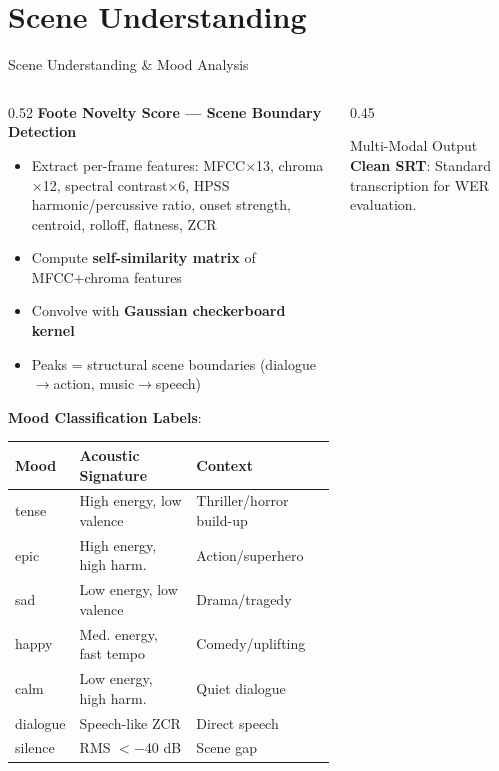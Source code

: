 \documentclass[aspectratio=169]{beamer}
\begin{document}
\section{Scene Understanding}
\begin{frame}{Scene Understanding \& Mood Analysis}
  \begin{columns}[T]
    \begin{column}{0.52\textwidth}
      \textbf{Foote Novelty Score — Scene Boundary Detection}
      \begin{itemize}
        \item Extract per-frame features: MFCC$\times$13, chroma$\times$12, spectral contrast$\times$6, HPSS harmonic/percussive ratio, onset strength, centroid, rolloff, flatness, ZCR
        \item Compute \textbf{self-similarity matrix} of MFCC+chroma features
        \item Convolve with \textbf{Gaussian checkerboard kernel}
        \item Peaks = structural scene boundaries (dialogue$\to$action, music$\to$speech)
      \end{itemize}

      \vspace{0.3cm}
      \textbf{Mood Classification Labels}:
      \begin{center}
        \scriptsize
        \begin{tabular}{@{}lll@{}}
          \toprule
          \textbf{Mood} & \textbf{Acoustic Signature} & \textbf{Context} \\
          \midrule
          tense & High energy, low valence & Thriller/horror build-up \\
          epic & High energy, high harm. & Action/superhero \\
          sad & Low energy, low valence & Drama/tragedy \\
          happy & Med. energy, fast tempo & Comedy/uplifting \\
          calm & Low energy, high harm. & Quiet dialogue \\
          dialogue & Speech-like ZCR & Direct speech \\
          silence & RMS $< -40$ dB & Scene gap \\
          \bottomrule
        \end{tabular}
      \end{center}
    \end{column}
    \begin{column}{0.45\textwidth}
      \begin{block}{Multi-Modal Output}
        \textbf{Clean SRT}: Standard transcription for WER evaluation.


\end{block}
\end{column}
\end{columns}
\end{frame}
\end{document}
